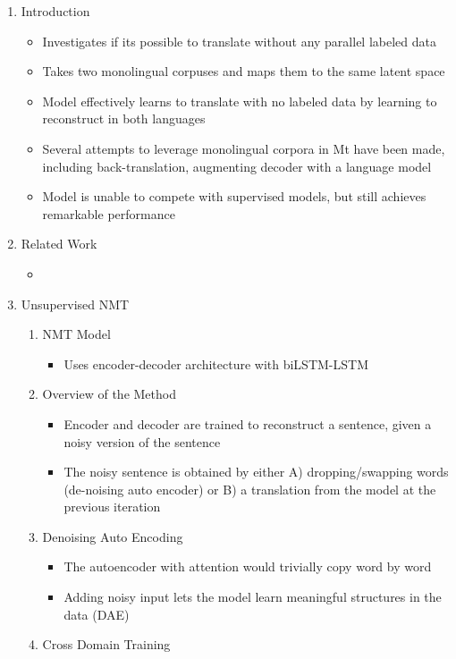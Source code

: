 \documentclass{article}
\begin{document}
\begin{enumerate}
	\item Introduction
	\begin{itemize}
		\item Investigates if its possible to translate without any parallel labeled data
		\item Takes two monolingual corpuses and maps them to the same latent space
		\item Model effectively learns to translate with no labeled data by learning to reconstruct in both languages
		\item Several attempts to leverage monolingual corpora in Mt have been made, including back-translation, augmenting decoder with a language model
		\item Model is unable to compete with supervised models, but still achieves remarkable performance
	\end{itemize}
	\item Related Work
	\begin{itemize}
		\item 
	\end{itemize}
	\item Unsupervised NMT
	\begin{enumerate}
		\item NMT Model
		\begin{itemize}
			\item Uses encoder-decoder architecture with biLSTM-LSTM
		\end{itemize}
		\item Overview of the Method
		\begin{itemize}
			\item Encoder and decoder are trained to reconstruct a sentence, given a noisy version of the sentence
			\item The noisy sentence is obtained by either A) dropping/swapping words  (de-noising auto encoder) or B) a translation from the model at the previous iteration
		\end{itemize}
		\item Denoising Auto Encoding
		\begin{itemize}
			\item The autoencoder with attention would trivially copy word by word 
			\item Adding noisy input lets the model learn meaningful structures in the data (DAE)
		\end{itemize}
		\item Cross Domain Training

\end{enumerate}
\end{enumerate}
\end{document}

